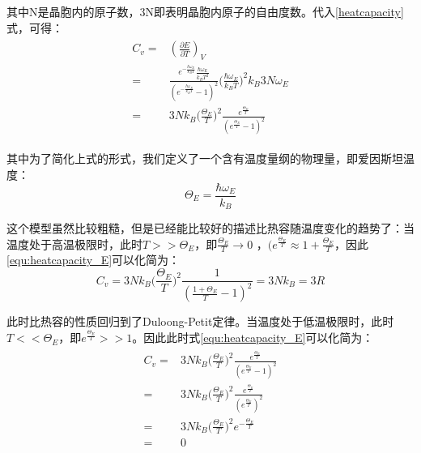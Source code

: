 \documentclass{ctexart}
\begin{document}
                其中N是晶胞内的原子数，3N即表明晶胞内原子的自由度数。代入\eqref{heatcapacity}式，可得：
                \begin{align}\label{equ:heatcapacity_E}
                    \begin{split}
                        C_v=&\left(\frac{\partial E}{\partial T}\right)_V\\
                        =&\frac{e^{-\frac{\hbar\omega_E}{k_BT}}\frac{\hbar\omega_E}{k_BT^2}}{(e^{-\frac{\hbar\omega_E}{k_BT}}-1)^2}\Big(\frac{\hbar\omega_E}{k_BT}\Big)^2 k_B 3N\omega_E\\
                        =&3Nk_B\Big(\frac{\Theta_E}{T}\Big)^2\frac{e^{\frac{\Theta_E}{T}}}{(e^{\frac{\Theta_E}{T}}-1)^2}
                    \end{split}
                \end{align}
                
                其中为了简化上式的形式，我们定义了一个含有温度量纲的物理量，即爱因斯坦温度：
                    \begin{equation}
                        \Theta_E=\frac{\hbar\omega_E}{k_B}
                    \end{equation}
                
                这个模型虽然比较粗糙，但是已经能比较好的描述比热容随温度变化的趋势了：当温度处于高温极限时，此时$T>>\Theta_E$，即$\frac{\Theta_E}{T}\rightarrow 0$ ，$(e^{\frac{\Theta_E}{T}}\approx 1+\frac{\Theta_E}{T}$，因此\eqref{equ:heatcapacity_E}可以化简为：
                \begin{equation}
                    C_v=3Nk_B\Big(\frac{\Theta_E}{T}\Big)^2\frac{1}{(\frac{1+\Theta_E}{T}-1)^2}=3Nk_B=3R
                \end{equation}
                
                此时比热容的性质回归到了Duloong-Petit定律。当温度处于低温极限时，此时$T<<\Theta_E$，即$e^{\frac{\Theta_E}{T}}>>1$。因此此时式\eqref{equ:heatcapacity_E}可以化简为：
                \begin{align}
                    \begin{split}
                     C_v=&3Nk_B\Big(\frac{\Theta_E}{T}\Big)^2\frac{e^{\frac{\Theta_E}{T}}}{(e^{\frac{\Theta_E}{T}}-1)^2}\\
                     =&3Nk_B\Big(\frac{\Theta_E}{T}\Big)^2\frac{e^{\frac{\Theta_E}{T}}}{(e^{\frac{\Theta_E}{T}})^2}\\
                     =&3Nk_B\Big(\frac{\Theta_E}{T}\Big)^2e^{-\frac{\Theta_E}{T}} \\
                     =& 0
                    \end{split}
                \end{align}
                
\end{document}

